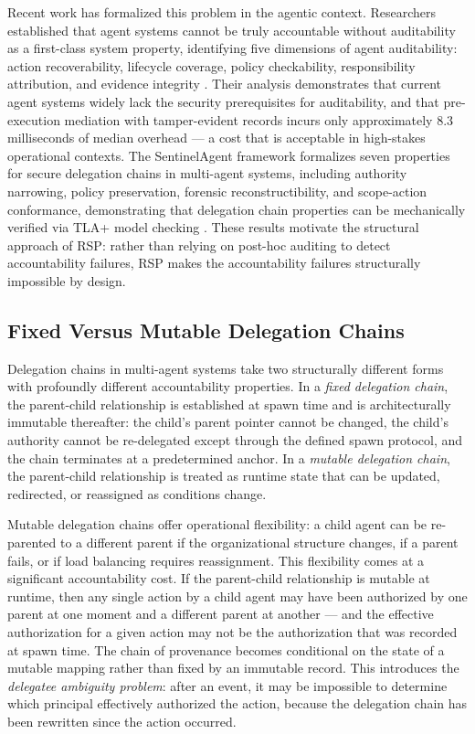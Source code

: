 Recent work has formalized this problem in the agentic context. Researchers established that agent systems cannot be truly accountable without auditability as a first-class system property, identifying five dimensions of agent auditability: action recoverability, lifecycle coverage, policy checkability, responsibility attribution, and evidence integrity \cite{arxiv260405485}. Their analysis demonstrates that current agent systems widely lack the security prerequisites for auditability, and that pre-execution mediation with tamper-evident records incurs only approximately 8.3 milliseconds of median overhead --- a cost that is acceptable in high-stakes operational contexts. The SentinelAgent framework formalizes seven properties for secure delegation chains in multi-agent systems, including authority narrowing, policy preservation, forensic reconstructibility, and scope-action conformance, demonstrating that delegation chain properties can be mechanically verified via TLA+ model checking \cite{sentinelagent2025}. These results motivate the structural approach of RSP: rather than relying on post-hoc auditing to detect accountability failures, RSP makes the accountability failures structurally impossible by design.

\subsection{Fixed Versus Mutable Delegation Chains}

Delegation chains in multi-agent systems take two structurally different forms with profoundly different accountability properties. In a \emph{fixed delegation chain}, the parent-child relationship is established at spawn time and is architecturally immutable thereafter: the child's parent pointer cannot be changed, the child's authority cannot be re-delegated except through the defined spawn protocol, and the chain terminates at a predetermined anchor. In a \emph{mutable delegation chain}, the parent-child relationship is treated as runtime state that can be updated, redirected, or reassigned as conditions change.

Mutable delegation chains offer operational flexibility: a child agent can be re-parented to a different parent if the organizational structure changes, if a parent fails, or if load balancing requires reassignment. This flexibility comes at a significant accountability cost. If the parent-child relationship is mutable at runtime, then any single action by a child agent may have been authorized by one parent at one moment and a different parent at another --- and the effective authorization for a given action may not be the authorization that was recorded at spawn time. The chain of provenance becomes conditional on the state of a mutable mapping rather than fixed by an immutable record. This introduces the \emph{delegatee ambiguity problem}: after an event, it may be impossible to determine which principal effectively authorized the action, because the delegation chain has been rewritten since the action occurred.

